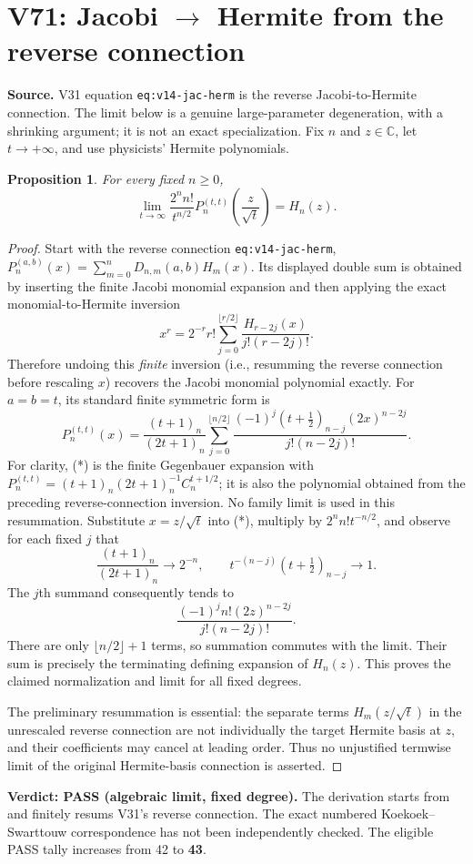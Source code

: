 \documentclass[11pt]{article}
\newtheorem{proposition}{Proposition}
\begin{document}
\section{V71: Jacobi $\to$ Hermite from the reverse connection}
\noindent\textbf{Source.} V31 equation \texttt{eq:v14-jac-herm} is the reverse Jacobi-to-Hermite connection. The limit below is a genuine large-parameter degeneration, with a shrinking argument; it is not an exact specialization. Fix $n$ and $z\in\mathbb C$, let $t\to+\infty$, and use physicists' Hermite polynomials.
\begin{proposition}
For every fixed $n\geq0$,
\[
\boxed{\displaystyle\lim_{t\to\infty}\frac{2^n n!}{t^{n/2}}
 P_n^{(t,t)}\!\left(\frac{z}{\sqrt t}\right)=H_n(z).}
\]
\end{proposition}
\begin{proof}
Start with the reverse connection \texttt{eq:v14-jac-herm},
$P_n^{(a,b)}(x)=\sum_{m=0}^n D_{n,m}(a,b)H_m(x)$.
Its displayed double sum is obtained by inserting the finite Jacobi monomial expansion and then applying the exact monomial-to-Hermite inversion
\[
 x^r=2^{-r}r!\sum_{j=0}^{\lfloor r/2\rfloor}
 \frac{H_{r-2j}(x)}{j!(r-2j)!}.
\]
Therefore undoing this \emph{finite} inversion (i.e., resumming the reverse connection before rescaling $x$) recovers the Jacobi monomial polynomial exactly. For $a=b=t$, its standard finite symmetric form is
\[
 P_n^{(t,t)}(x)=\frac{(t+1)_n}{(2t+1)_n}
 \sum_{j=0}^{\lfloor n/2\rfloor}
 \frac{(-1)^j(t+\tfrac12)_{n-j}(2x)^{n-2j}}{j!(n-2j)!}.
\tag{*}
\]
For clarity, (*) is the finite Gegenbauer expansion with
$P_n^{(t,t)}=(t+1)_n(2t+1)_n^{-1}C_n^{t+1/2}$;
it is also the polynomial obtained from the preceding reverse-connection inversion. No family limit is used in this resummation.
Substitute $x=z/\sqrt t$ into (*), multiply by $2^nn!t^{-n/2}$, and observe for each fixed $j$ that
\[
 \frac{(t+1)_n}{(2t+1)_n}\longrightarrow 2^{-n},\qquad
 t^{-(n-j)}(t+\tfrac12)_{n-j}\longrightarrow1.
\]
The $j$th summand consequently tends to
\[
 \frac{(-1)^j n! (2z)^{n-2j}}{j!(n-2j)!}.
\]
There are only $\lfloor n/2\rfloor+1$ terms, so summation commutes with the limit. Their sum is precisely the terminating defining expansion of $H_n(z)$. This proves the claimed normalization and limit for all fixed degrees.

The preliminary resummation is essential: the separate terms $H_m(z/\sqrt t)$ in the unrescaled reverse connection are not individually the target Hermite basis at $z$, and their coefficients may cancel at leading order. Thus no unjustified termwise limit of the original Hermite-basis connection is asserted.
\end{proof}
\noindent\textbf{Verdict: PASS (algebraic limit, fixed degree).} The derivation starts from and finitely resums V31's reverse connection. The exact numbered Koekoek--Swarttouw correspondence has not been independently checked. The eligible PASS tally increases from 42 to \textbf{43}.
\end{document}
